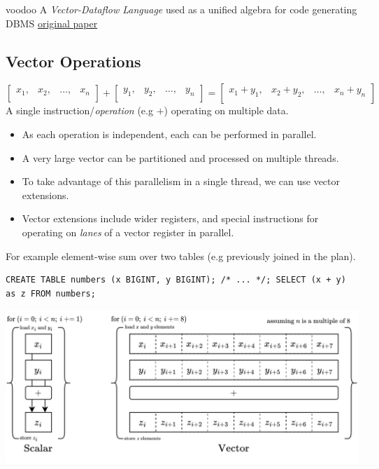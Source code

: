\begin{definitionbox}{voodoo}
    A \textit{Vector-Dataflow Language} used as a unified algebra for code generating DBMS
    \href{https://www.cs.albany.edu/~jhh/courses/readings/pirk.pvldb16.pdf}{original paper}
\end{definitionbox}

\subsection{Vector Operations}
\[\begin{bmatrix}
        x_1, & x_2, & \dots, & x_n \\
    \end{bmatrix} + \begin{bmatrix}
        y_1, & y_2, & \dots, & y_n \\
    \end{bmatrix} = \begin{bmatrix}
        x_1 + y_1, & x_2 + y_2, & \dots, & x_n + y_n \\
    \end{bmatrix}\]
A single instruction/\textit{operation} (e.g $+$) operating on multiple data.
\begin{itemize}
    \item As each operation is independent, each can be performed in parallel.
    \item A very large vector can be partitioned and processed on multiple threads.
    \item To take advantage of this parallelism in a single thread, we can use vector extensions.
    \item Vector extensions include wider registers, and special instructions for operating on \textit{lanes} of a vector register in parallel.
\end{itemize}
\noindent For example element-wise sum over two tables (e.g previously joined in the plan).
\begin{verbatim}
CREATE TABLE numbers (x BIGINT, y BIGINT); /* ... */; SELECT (x + y) as z FROM numbers;
\end{verbatim}
\begin{center}
    \includegraphics[width=\textwidth]{advanced_topics/images/vector_arithmetic.drawio.png}
\end{center}

